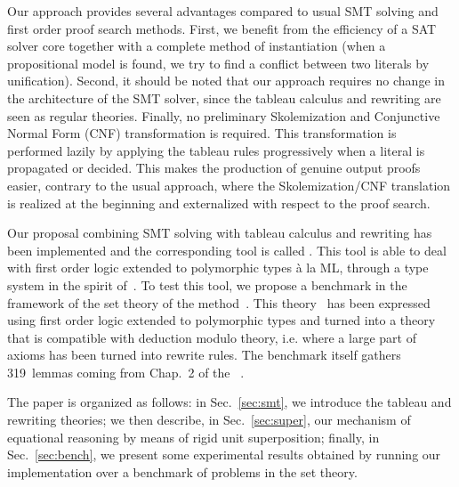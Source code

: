 Our approach provides several advantages compared to usual SMT solving and first
order proof search methods. First, we benefit from the efficiency of a SAT
solver core together with a complete method of instantiation (when a
propositional model is found, we try to find a conflict between two literals by
unification). Second, it should be noted that our approach requires no change in
the architecture of the SMT solver, since the tableau calculus and rewriting are
seen as regular theories. Finally, no preliminary Skolemization and Conjunctive
Normal Form (CNF) transformation is required. This transformation is performed
lazily by applying the tableau rules progressively when a literal is propagated
or decided. This makes the production of genuine output proofs easier, contrary
to the usual approach, where the Skolemization/CNF translation is realized at
the beginning and externalized with respect to the proof search.

Our proposal combining SMT solving with tableau calculus and rewriting has been
implemented and the corresponding tool is called \archsat{}. This tool is able
to deal with first order logic extended to polymorphic types à la ML, through a
type system in the spirit of~\cite{BP13}. To test this tool, we propose a
benchmark in the framework of the set theory of the \bmth{}
method~\cite{B-Book}. This theory~\cite{BA15} has been expressed using first
order logic extended to polymorphic types and turned into a theory that is
compatible with deduction modulo theory, i.e. where a large part of axioms has
been turned into rewrite rules. The benchmark itself gathers 319~lemmas coming
from Chap.~2 of the \bbook{}~\cite{B-Book}.

The paper is organized as follows: in Sec.~\ref{sec:smt}, we introduce the tableau
and rewriting theories; we then describe, in Sec.~\ref{sec:super}, our mechanism
of equational reasoning by means of rigid unit superposition; finally, in
Sec.~\ref{sec:bench}, we present some experimental results obtained by running
our implementation over a benchmark of problems in the \bmth{} set theory.
